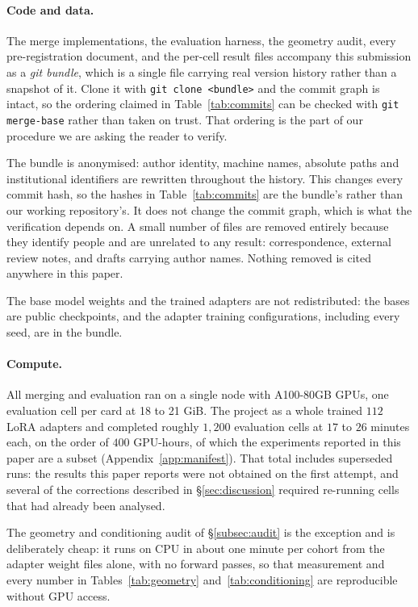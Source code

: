 \paragraph{Code and data.} The merge implementations, the evaluation
harness, the geometry audit, every pre-registration document, and the
per-cell result files accompany this submission as a \emph{git bundle},
which is a single file carrying real version history rather than a
snapshot of it. Clone it with \texttt{git clone <bundle>} and the commit
graph is intact, so the ordering claimed in Table~\ref{tab:commits} can be
checked with \texttt{git merge-base} rather than taken on trust. That
ordering is the part of our procedure we are asking the reader to verify.

The bundle is anonymised: author identity, machine names, absolute paths
and institutional identifiers are rewritten throughout the history. This
changes every commit hash, so the hashes in Table~\ref{tab:commits} are the
bundle's rather than our working repository's. It does not change the
commit graph, which is what the verification depends on. A small number of
files are removed entirely because they identify people and are unrelated
to any result: correspondence, external review notes, and drafts carrying
author names. Nothing removed is cited anywhere in this paper.

The base model weights and the trained adapters are not redistributed: the
bases are public checkpoints, and the adapter training configurations,
including every seed, are in the bundle.

\paragraph{Compute.} All merging and evaluation ran on a single node with
A100-80GB GPUs, one evaluation cell per card at 18 to 21 GiB. The project
as a whole trained $112$ LoRA adapters and completed roughly $1{,}200$
evaluation cells at $17$ to $26$ minutes each, on the order of $400$
GPU-hours, of which the experiments reported in this paper are a subset
(Appendix~\ref{app:manifest}). That total includes superseded runs: the
results this paper reports were not obtained on the first attempt, and
several of the corrections described in \S\ref{sec:discussion} required
re-running cells that had already been analysed.

The geometry and conditioning audit of \S\ref{subsec:audit} is the
exception and is deliberately cheap: it runs on CPU in about one minute
per cohort from the adapter weight files alone, with no forward passes, so
that measurement and every number in Tables~\ref{tab:geometry}
and~\ref{tab:conditioning} are reproducible without GPU access.

